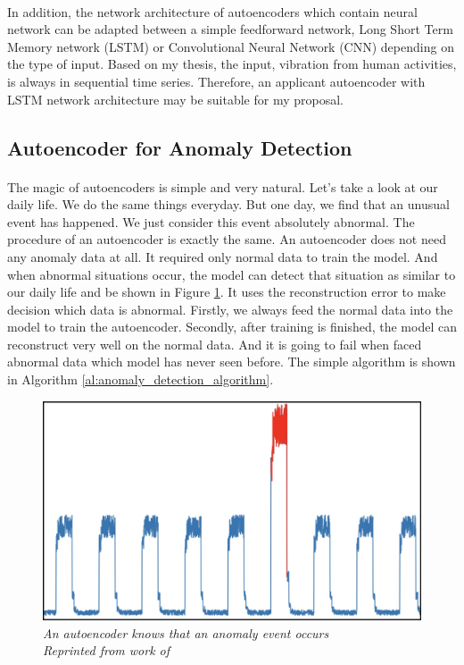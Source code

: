 \paragraph{}
In addition, the network architecture of autoencoders which contain neural network can be adapted between a simple feedforward network, Long Short Term Memory network (LSTM) or Convolutional Neural Network (CNN) depending on the type of input. Based on my thesis, the input, vibration from human activities, is always in sequential time series. Therefore, an applicant autoencoder with LSTM network architecture may be suitable for my proposal.

\subsection{Autoencoder for Anomaly Detection}
\paragraph{}
The magic of autoencoders is simple and very natural. Let’s take a look at our daily life. We do the same things everyday. But one day, we find that an unusual event has happened. We just consider this event absolutely abnormal. The procedure of an autoencoder is exactly the same. An autoencoder does not need any anomaly data at all. It required only normal data to train the model. And when abnormal situations occur, the model can detect that situation as similar to our daily life and be shown in Figure \ref{fig:ae_detection}. It uses the reconstruction error to make decision which data is abnormal. Firstly, we always feed the normal data into the model to train the autoencoder. Secondly, after training is finished, the model can reconstruct very well on the normal data. And it is going to fail when faced abnormal data which model has never seen before. The simple algorithm is shown in Algorithm \ref{al:anomaly_detection_algorithm}.

\begin{figure}[H]
  \centering
  \caption[An autoencoder knows that an anomaly event occurs]{\emph{An autoencoder knows that an anomaly event occurs \\ Reprinted from work of \citeauthor{pavithrasv_2020} \citeyear{pavithrasv_2020}}}\label{fig:ae_detection}
  \includegraphics[scale = 0.2]{figures/ae_detection.jpg}  
\end{figure}

